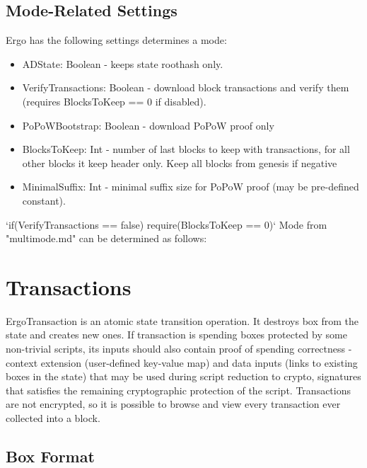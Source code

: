 \documentclass[]{article}   %
\newcommand{\coin}{box}
\newcommand{\Coin}{Box}
\begin{document}
\subsection{Mode-Related Settings}
Ergo has the following settings determines a mode:
\begin{itemize}
\item ADState: Boolean - keeps state roothash only.
\item VerifyTransactions: Boolean - download block transactions and verify them (requires BlocksToKeep == 0 if disabled).
\item PoPoWBootstrap: Boolean - download PoPoW proof only
\item BlocksToKeep: Int - number of last blocks to keep with transactions, for all other blocks it keep header
only. Keep all blocks from genesis if negative
\item MinimalSuffix: Int - minimal suffix size for PoPoW proof (may be pre-defined constant).
\end{itemize}
\par
‘if(VerifyTransactions == false) require(BlocksToKeep == 0)‘ Mode from "multimode.md" can be determined as follows:









\section{Transactions}

ErgoTransaction is an atomic state transition operation. It destroys \coin{} from the state
and creates new ones. If transaction is spending boxes protected by some non-trivial scripts,
its inputs should also contain proof of spending correctness - context extension (user-defined
key-value map) and data inputs (links to existing boxes in the state) that may be used during
script reduction to crypto, signatures that satisfies the remaining cryptographic protection
of the script.
Transactions are not encrypted, so it is possible to browse and view every transaction ever collected into a block.

\subsection{\Coin{} Format}
\label{box-format}
\end{document}
